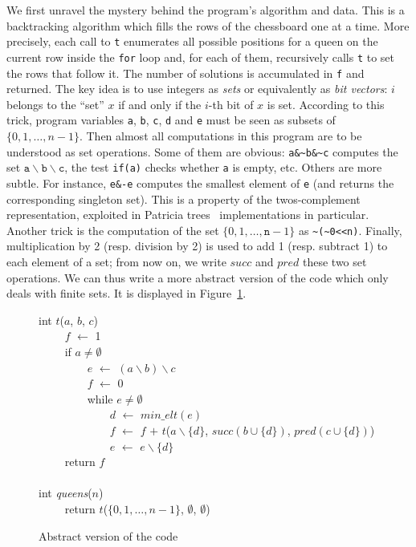 \documentclass[a4paper]{llncs}
\newcommand{\kw}[1]{\textsf{#1}}
\newcommand{\minelt}[1]{\ensuremath{\mathit{min\_elt}(#1)}}
\begin{document}
We first unravel the mystery behind the program's algorithm and data.
This is a backtracking algorithm
which fills the rows of the chessboard one at a time.
More precisely, each call to \texttt{t} enumerates all possible
positions for a queen on the current row inside the \texttt{for} loop
and, for each of them, recursively calls \texttt{t} to set the 
rows that follow it.  The number of solutions is accumulated in \texttt{f} and
returned.  The key idea is to use integers as \emph{sets} or
equivalently as \emph{bit vectors}: $i$ belongs to the ``set'' $x$ if and
only if the $i$-th bit of $x$ is set.
According to this trick, program variables
\texttt{a}, \texttt{b}, \texttt{c}, \texttt{d} and \texttt{e} must
be seen as subsets of $\{0,1,\dots,n-1\}$.
Then almost all computations in this program are to be
understood as set operations. Some of them are obvious: \verb!a&~b&~c!
computes the set $\mathtt{a}\backslash\mathtt{b}\backslash\mathtt{c}$,
the test \verb!if(a)! checks whether \texttt{a} is empty, etc. Others
are more subtle. For instance, \verb!e&-e! computes the smallest
element of \texttt{e} (and returns the corresponding singleton set). This is a 
property of the twos-complement representation, exploited in
Patricia trees~\cite{patricia} implementations in particular.
Another trick is the computation of the set
$\{0,1,\dots,\mathtt{n}-1\}$ as \verb!~(~0<<n)!. Finally,
multiplication by 2 (resp. division by 2) is used to add 1 (resp.
subtract 1) to each element of a set; from now on, we write $\mathit{succ}$ and
$\mathit{pred}$ these two 
set operations. We can thus write a more
abstract version of the code which only deals with finite sets. It is
displayed in Figure~\ref{fig:abstract}.

\begin{figure}[t]
  \hrulefill\vspace{-0.2em}
{\begin{obeylines}
  \kw{int} $t$($a$, $b$, $c$) 
  ~~~~ $f$ $\leftarrow$ 1
  ~~~~ \kw{if} $a \not= \emptyset$ 
  ~~~~~~~~ $e$ $\leftarrow$ $(a \backslash  b) \backslash c$ 
  ~~~~~~~~ $f$ $\leftarrow$ 0 
  ~~~~~~~~ \kw{while} $e \not=\emptyset$ 
  ~~~~~~~~~~~~ $d$ $\leftarrow$ $\minelt{e}$ 
  ~~~~~~~~~~~~ $f$ $\leftarrow$ $f$ $+$ $t$($a\backslash \{d\}$, $\mathit{succ}(b\cup\{d\})$, $\mathit{pred}(c\cup\{d\})$) 
  ~~~~~~~~~~~~ $e$ $\leftarrow$ $e \backslash  \{d\}$ 
  ~~~~ \kw{return} $f$ 
  ~~~~ 
  \kw{int} \textit{queens}($n$) 
  ~~~~ \kw{return} $t$($\{0,1,\dots,n-1\}$, $\emptyset$, $\emptyset$)
\end{obeylines}}
\vspace{-0.6em}\hrulefill\vspace{-1em}
  \caption{Abstract version of the code}
  \label{fig:abstract}
\end{figure}
\end{document}
